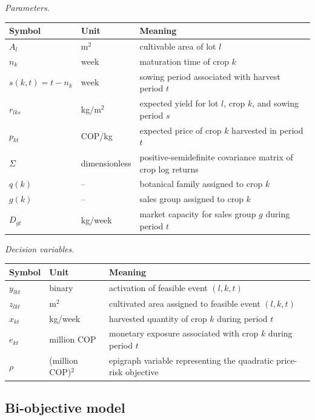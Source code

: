 \documentclass[]{interact}
\begin{document}
\noindent\textit{Parameters.}
\begin{center}
\begin{tabular}{@{}llp{}@{}}
\toprule
Symbol & Unit & Meaning \\
\midrule
$A_l$ & m$^2$ & cultivable area of lot $l$ \\
$n_k$ & week & maturation time of crop $k$ \\
$s(k,t)=t-n_k$ & week & sowing period associated with harvest period $t$ \\
$r_{lks}$ & kg/m$^2$ & expected yield for lot $l$, crop $k$, and sowing period $s$ \\
$p_{kt}$ & COP/kg & expected price of crop $k$ harvested in period $t$ \\
$\Sigma$ & dimensionless & positive-semidefinite covariance matrix of crop log returns \\
$q(k)$ & -- & botanical family assigned to crop $k$ \\
$g(k)$ & -- & sales group assigned to crop $k$ \\
$D_{gt}$ & kg/week & market capacity for sales group $g$ during period $t$ \\
\bottomrule
\end{tabular}
\end{center}

\noindent\textit{Decision variables.}
\begin{center}
\begin{tabular}{@{}llp{}@{}}
\toprule
Symbol & Unit & Meaning \\
\midrule
$y_{lkt}$ & binary & activation of feasible event $(l,k,t)$ \\
$z_{lkt}$ & m$^2$ & cultivated area assigned to feasible event $(l,k,t)$ \\
$x_{kt}$ & kg/week & harvested quantity of crop $k$ during period $t$ \\
$e_{kt}$ & million COP & monetary exposure associated with crop $k$ during period $t$ \\
$\rho$ & (million COP)$^2$ & epigraph variable representing the quadratic price-risk objective \\
\bottomrule
\end{tabular}
\end{center}

\subsection{Bi-objective model}
\end{document}
